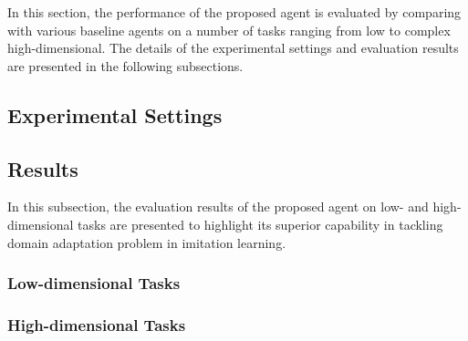 In this section, the performance of the proposed \DAIL{} agent is evaluated by comparing with various baseline agents on a number of tasks ranging from low to complex high-dimensional.
The details of the experimental settings and evaluation results are presented in the following subsections.

\subsection{Experimental Settings}


\subsection{Results}
In this subsection, the evaluation results of the proposed \DAIL{} agent on low- and high-dimensional tasks are presented to highlight its superior capability in tackling domain adaptation problem in imitation learning.

\subsubsection{Low-dimensional Tasks}


\subsubsection{High-dimensional Tasks}

